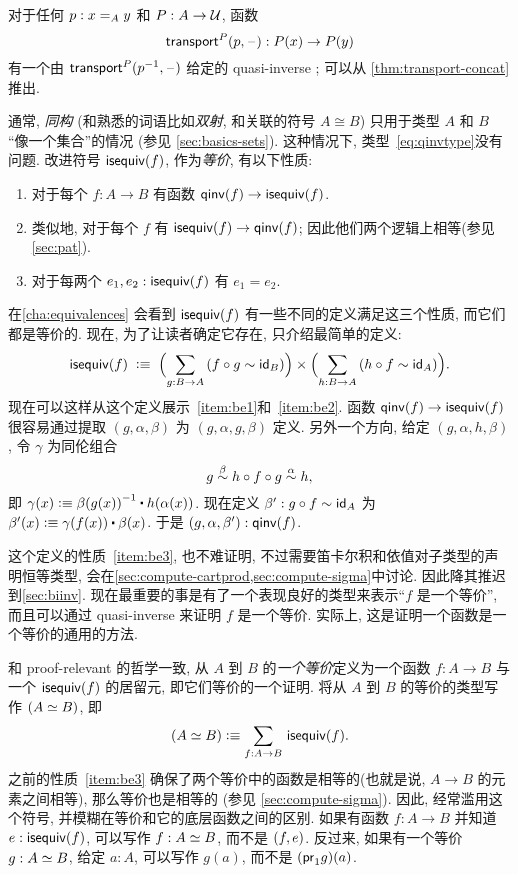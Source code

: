 \begin{eg}\label{thm:transportequiv}
  对于任何 $p:\id[A]xy$ 和 $P:A\to\type$, 函数
  \[\transfib{P}{p}{\blank}:P(x) \to P(y)\]
  有一个由 $\transfib{P}{\opp p}{\blank}$ 给定的  quasi-inverse ; 可以从 \narrowbreak \cref{thm:transport-concat} 推出.
\end{eg}

通常, \emph{同构}
(和熟悉的词语比如\emph{双射}, 和关联的符号 $A\cong B$)
只用于类型 $A$ 和 $B$ ``像一个集合''的情况 (参见 \cref{sec:basics-sets}).
这种情况下, 类型~\eqref{eq:qinvtype}没有问题.
改进符号 $\isequiv (f)$, 作为\emph{等价}, 有以下性质:%
\begin{enumerate}
    \item 对于每个 $f:A\to B$ 有函数 $\qinv(f) \to \isequiv (f)$.\label{item:be1}
    \item 类似地, 对于每个 $f$ 有 $\isequiv (f) \to \qinv(f)$; 因此他们两个逻辑上相等(参见 \cref{sec:pat}).\label{item:be2}
    \item 对于每两个 $e_1,e_2:\isequiv(f)$ 有 $e_1=e_2$.\label{item:be3}
\end{enumerate}
在\cref{cha:equivalences} 会看到 $\isequiv(f)$ 有一些不同的定义满足这三个性质, 而它们都是等价的.
现在, 为了让读者确定它存在, 只介绍最简单的定义:
\begin{equation}\label{eq:isequiv-invertible}
  \isequiv(f) \;\defeq\;
  \Parens{\sm{g:B\to A} (f\circ g \htpy \idfunc[B])}
  \times
  \Parens{\sm{h:B\to A} (h\circ f \htpy \idfunc[A])}.
\end{equation}
现在可以这样从这个定义展示~\ref{item:be1}和~\ref{item:be2}.
函数 $\qinv(f) \to \isequiv (f)$ 很容易通过提取 $(g,\alpha,\beta)$ 为 $(g,\alpha,g,\beta)$ 定义.
另外一个方向, 给定 $(g,\alpha,h,\beta)$, 令 $\gamma$ 为同伦组合
\[ g \overset{\beta}{\htpy} h\circ f\circ g \overset{\alpha}{\htpy} h, \]
即 $\gamma(x) \defeq \opp{\beta(g(x))} \ct \ap{h}{\alpha(x)}$.
现在定义 $\beta':g\circ f\htpy \idfunc[A]$ 为 $\beta'(x) \defeq \gamma(f(x)) \ct \beta(x)$.
于是 $(g,\alpha,\beta'):\qinv(f)$.

这个定义的性质~\ref{item:be3}, 也不难证明, 不过需要笛卡尔积和依值对子类型的声明恒等类型, 会在\cref{sec:compute-cartprod,sec:compute-sigma}中讨论.
因此降其推迟到\cref{sec:biinv}.
现在最重要的事是有了一个表现良好的类型来表示``$f$ 是一个等价'', 而且可以通过 quasi-inverse 来证明 $f$ 是一个等价.
实际上, 这是证明一个函数是一个等价的通用的方法.

和 proof-relevant 的哲学一致,
%
从 $A$ 到 $B$ 的\emph{一个等价}定义为一个函数 $f:A\to B$ 与一个 $\isequiv (f)$ 的居留元, 即它们等价的一个证明.
将从 $A$ 到 $B$ 的等价的类型写作 $(\eqv A B)$, 即
\begin{equation}\label{eq:eqv}
  (\eqv A B) \defeq \sm{f:A\to B} \isequiv(f).
\end{equation}
之前的性质~\ref{item:be3} 确保了两个等价中的函数是相等的(也就是说, $A\to B$ 的元素之间相等), 那么等价也是相等的 (参见 \cref{sec:compute-sigma}).
因此, 经常滥用这个符号, 并模糊在等价和它的底层函数之间的区别.
如果有函数 $f:A\to B$ 并知道 $e:\isequiv(f)$, 可以写作 $f:\eqv A B$, 而不是 $\tup{f}{e}$.
反过来, 如果有一个等价 $g:\eqv A B$, 给定 $a:A$, 可以写作 $g(a)$, 而不是 $(\proj1 g)(a)$.

